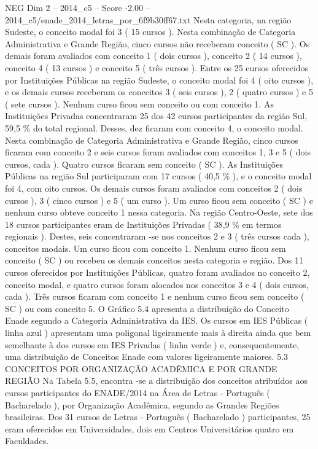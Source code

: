 \begin{textsample}{NEG Dim 2 – 2014\_c5 – Score -2.00 – 2014\_c5/enade\_2014\_letras\_por\_6f9b30ff67.txt}
Nesta categoria, na região Sudeste, o conceito modal foi 3 ( 15 cursos ).
Nesta combinação de Categoria Administrativa e Grande Região, cinco cursos não receberam conceito ( SC ).
Os demais foram avaliados com conceito 1 ( dois cursos ), conceito 2 ( 14 cursos ), conceito 4 ( 13 cursos ) e conceito 5 ( três cursos ).
Entre os 25 cursos oferecidos por Instituições Públicas na região Sudeste, o conceito modal foi 4 ( oito cursos ), e os demais cursos receberam os conceitos 3 ( seis cursos ), 2 ( quatro cursos ) e 5 ( sete cursos ).
Nenhum curso ficou sem conceito ou com conceito 1.
As Instituições Privadas concentraram 25 dos 42 cursos participantes da região Sul, 59,5 \% do total regional.
Desses, dez ficaram com conceito 4, o conceito modal.
Nesta combinação de Categoria Administrativa e Grande Região, cinco cursos ficaram com conceito 2 e seis cursos foram avaliados com conceitos 1, 3 e 5 ( dois cursos, cada ).
Quatro cursos ficaram sem conceito ( SC ).
As Instituições Públicas na região Sul participaram com 17 cursos ( 40,5 \% ), e o conceito modal foi 4, com oito cursos.
Os demais cursos foram avaliados com conceitos 2 ( dois cursos ), 3 ( cinco cursos ) e 5 ( um curso ).
Um curso ficou sem conceito ( SC ) e nenhum curso obteve conceito 1 nessa categoria.
Na região Centro-Oeste, sete dos 18 cursos participantes eram de Instituições Privadas ( 38,9 \% em termos regionais ).
Destes, seis concentraram -se nos conceitos 2 e 3 ( três cursos cada ), conceitos modais.
Um curso ficou com conceito 1.
Nenhum curso ficou sem conceito ( SC ) ou recebeu os demais conceitos nesta categoria e região.
Dos 11 cursos oferecidos por Instituições Públicas, quatro foram avaliados no conceito 2, conceito modal, e quatro cursos foram alocados nos conceitos 3 e 4 ( dois cursos, cada ).
Três cursos ficaram com conceito 1 e nenhum curso ficou sem conceito ( SC ) ou com conceito 5.
O Gráfico 5.4 apresenta a distribuição do Conceito Enade segundo a Categoria Administrativa da IES.
Os cursos em IES Públicas ( linha azul ) apresentam uma poligonal ligeiramente mais à direita ainda que bem semelhante à dos cursos em IES Privadas ( linha verde ) e, consequentemente, uma distribuição de Conceitos Enade com valores ligeiramente maiores. 5.3 CONCEITOS POR ORGANIZAÇÃO ACADÊMICA E POR GRANDE REGIÃO Na Tabela 5.5, encontra -se a distribuição dos conceitos atribuídos aos cursos participantes do ENADE/2014 na Área de Letras - Português ( Bacharelado ), por Organização Acadêmica, segundo as Grandes Regiões brasileiras.
Dos 31 cursos de Letras - Português ( Bacharelado ) participantes, 25 eram oferecidos em Universidades, dois em Centros Universitários quatro em Faculdades.

\end{textsample}
